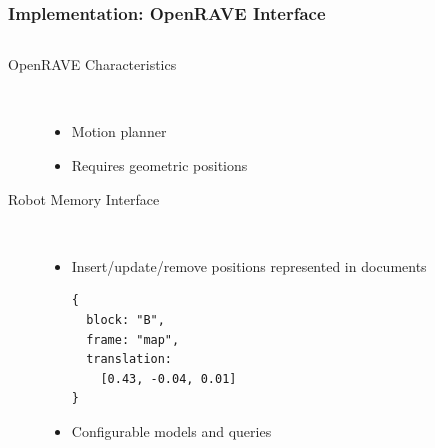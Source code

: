 \begin{frame}[fragile]
  \frametitle{Implementation: OpenRAVE Interface}
  \begin{columns}
    \begin{column}{0.6\textwidth}
  \begin{description}
  \item[OpenRAVE Characteristics]%
                \hfill \\
    \begin{itemize}
    \item Motion planner
    \item Requires geometric positions
    \end{itemize}
  \item[Robot Memory Interface]%
                \hfill \\
    \begin{itemize}
    \item Insert/update/remove positions represented in documents
\begin{lstlisting}[style=SmallJSON,
  framexleftmargin=5pt, xleftmargin=0pt,linewidth=5cm,
 morekeywords={}, numbers=none]
{
  block: "B",
  frame: "map",
  translation:
    [0.43, -0.04, 0.01]
}
\end{lstlisting}
    \item Configurable models and queries
    \end{itemize}
  \end{description}
    \end{column}
    \begin{column}{0.4\textwidth}

\end{column}
\end{columns}
\end{frame}
